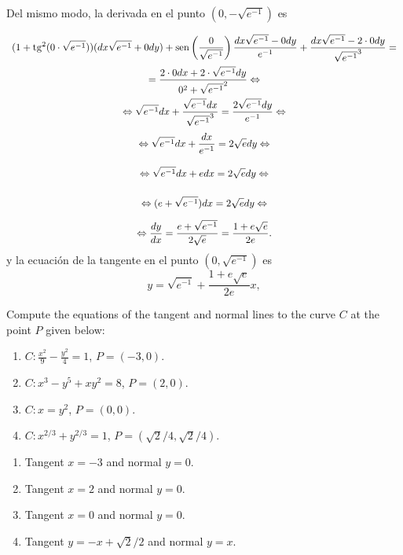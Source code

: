 {Del mismo modo, la derivada en el punto $(0,-\sqrt{e^{-1}})$ es
\[
\renewcommand{\arraystretch}{2.5}
\begin{array}{c} \displaystyle
(1+\tg^2(0\cdot \sqrt{e^{-1}}))(dx\sqrt{e^{-1}}+0dy)+\sen\left(\frac{0}{\sqrt{e^{-1}}}\right)\frac{dx\sqrt{e^{-1}}-0dy}{e^{-1}}+\frac{dx\sqrt{e^{-1}}-2\cdot 0dy}{\sqrt{e^{-1}}^3}= \\ \displaystyle
= \frac{2\cdot 0dx+2\cdot\sqrt{e^{-1}}dy}{0^2+\sqrt{e^{-1}}^2} \Leftrightarrow\\ \displaystyle
\Leftrightarrow \sqrt{e^{-1}}dx+\frac{\sqrt{e^{-1}}dx}{\sqrt{e^{-1}}^3} =
\frac{2\sqrt{e^{-1}}dy}{e^{-1}} \Leftrightarrow\\ \displaystyle
\Leftrightarrow \sqrt{e^{-1}}dx+\frac{dx}{e^{-1}} =
2\sqrt{e}dy \Leftrightarrow\\ \displaystyle
\Leftrightarrow \sqrt{e^{-1}}dx+edx = 2\sqrt{e}dy \Leftrightarrow\\ \displaystyle
\Leftrightarrow (e+\sqrt{e^{-1}})dx = 2\sqrt{e}dy \Leftrightarrow\\ \displaystyle
\Leftrightarrow \frac{dy}{dx} = \frac{e+\sqrt{e^{-1}}}{2\sqrt{e}} = \frac{1+e\sqrt{e}}{2e}.
\end{array}
\]
y la ecuación de la tangente en el punto  $(0,\sqrt{e^{-1}})$ es
\[
y = \sqrt{e^{-1}} + \frac{1+e\sqrt{e}}{2e} x,
\]
}


{Compute the equations of the tangent and normal lines to the curve $C$ at the point $P$ given below:
\begin{enumerate}
\item $\displaystyle C:\frac{x^2}{9}-\frac{y^2}{4}=1$, $P=(-3,0)$.
\item $C:x^3-y^5+xy^2 = 8$, $P=(2,0)$.
\item $C:x=y^2$, $P=(0,0)$.
\item $C:x^{2/3}+y^{2/3}=1$, $P=(\sqrt2/4,\sqrt2/4)$.
\end{enumerate}
}
{\begin{enumerate}
\item Tangent $x=-3$ and normal $y=0$.
\item Tangent $x=2$ and normal $y=0$.
\item Tangent $x=0$ and normal $y=0$.
\item Tangent $y=-x+\sqrt{2}/2$ and normal $y=x$.
\end{enumerate}
}
{
}


